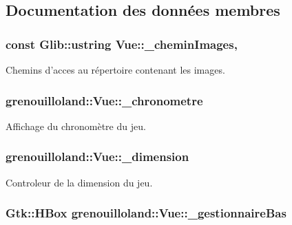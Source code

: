 \subsection{Documentation des données membres}
\hypertarget{classgrenouilloland_1_1Vue_a2129d9ff7713d6b8d8c2cd444c6c7344}{
\subsubsection[{\-\_\-chemin\-Images}]{\setlength{\rightskip}{0pt plus 5cm}const Glib\-::ustring Vue\-::\-\_\-chemin\-Images\hspace{0.3cm}{\ttfamily [static]}, {\ttfamily [protected]}}}\label{classgrenouilloland_1_1Vue_a2129d9ff7713d6b8d8c2cd444c6c7344}
Chemins d'acces au répertoire contenant les images. \hypertarget{classgrenouilloland_1_1Vue_a6632cb40512ad2d01c9a52b33de24aeb}{
\subsubsection[{\-\_\-chronometre}]{ grenouilloland\-::\-Vue\-::\-\_\-chronometre\hspace{0.3cm}{\ttfamily [protected]}}}\label{classgrenouilloland_1_1Vue_a6632cb40512ad2d01c9a52b33de24aeb}
Affichage du chronomètre du jeu. \hypertarget{classgrenouilloland_1_1Vue_a8913ac00882895d6a0552edc92266883}{
\subsubsection[{\-\_\-dimension}]{ grenouilloland\-::\-Vue\-::\-\_\-dimension\hspace{0.3cm}{\ttfamily [protected]}}}\label{classgrenouilloland_1_1Vue_a8913ac00882895d6a0552edc92266883}
Controleur de la dimension du jeu. \hypertarget{classgrenouilloland_1_1Vue_a65d5b3129325746ee1d1dbf0c3f3e0db}{
\subsubsection[{\-\_\-gestionnaire\-Bas}]{\setlength{\rightskip}{0pt plus 5cm}Gtk\-::\-H\-Box grenouilloland\-::\-Vue\-::\-\_\-gestionnaire\-Bas\hspace{0.3cm}{\ttfamily [protected]}}}\label{classgrenouilloland_1_1Vue_a65d5b3129325746ee1d1dbf0c3f3e0db}
